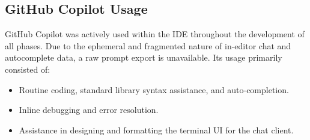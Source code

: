 \documentclass[11pt]{article}
\begin{document}
\subsection*{GitHub Copilot Usage}
GitHub Copilot was actively used within the IDE throughout the development of all phases. Due to the ephemeral and fragmented nature of in-editor chat and autocomplete data, a raw prompt export is unavailable. Its usage primarily consisted of:
\begin{itemize}
    \item Routine coding, standard library syntax assistance, and auto-completion.
    \item Inline debugging and error resolution.
    \item Assistance in designing and formatting the terminal UI for the chat client.
\end{itemize}
\end{document}
